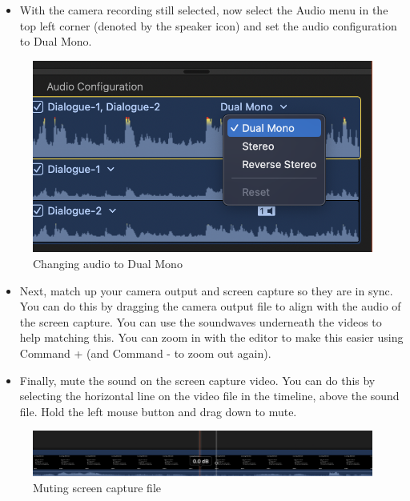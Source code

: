 \documentclass[
]{book}
\providecommand{\tightlist}{%
  \setlength{\itemsep}{0pt}\setlength{\parskip}{0pt}}
\begin{document}
\begin{itemize}
\tightlist
\item
  With the camera recording still selected, now select the Audio menu in the top left corner (denoted by the speaker icon) and set the audio configuration to Dual Mono.
\end{itemize}

\begin{figure}

{\centering \includegraphics[width=1\linewidth]{Audio} 

}

\caption{Changing audio to Dual Mono}\label{fig:audio}
\end{figure}

\begin{itemize}
\item
  Next, match up your camera output and screen capture so they are in sync. You can do this by dragging the camera output file to align with the audio of the screen capture. You can use the soundwaves underneath the videos to help matching this. You can zoom in with the editor to make this easier using Command + (and Command - to zoom out again).
\item
  Finally, mute the sound on the screen capture video. You can do this by selecting the horizontal line on the video file in the timeline, above the sound file. Hold the left mouse button and drag down to mute.
\end{itemize}

\begin{figure}

{\centering \includegraphics[width=1\linewidth]{Mute} 

}

\caption{Muting screen capture file}\label{fig:mute}
\end{figure}
\end{document}
